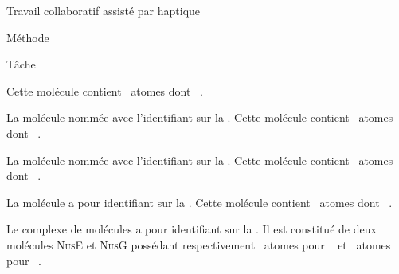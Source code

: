 \documentclass[myfrancais]{mythesis}
\begin{document}
\begin{mychapter}{Travail collaboratif assisté par haptique}
\begin{mysection}{Méthode}
\begin{mysubsection}{Tâche}
\begin{description}
						Cette molécule contient ~atomes dont ~.
					\item[\myPrion]
						La molécule nommée \myPrion {} avec l'identifiant \myPDB {} sur la \myPDBbase\footnotemark[\value{footnote}].
						Cette molécule contient ~atomes dont ~.
					\item[\myUbiquitin]
						La molécule nommée \myUbiquitin {} avec l'identifiant \myPDB {} sur la \myPDBbase\footnotemark[\value{footnote}].
						Cette molécule contient ~atomes dont ~.
					\item[\myTRPZIPPER]
						La molécule \myTRPZIPPER {} a pour identifiant \myPDB {} sur la \myPDBbase\footnotemark[\value{footnote}].
						Cette molécule contient ~atomes dont ~.
					\item[\myNusENusG]
						Le complexe de molécules \myNusENusG {} a pour identifiant \myPDB {} sur la \myPDBbase\footnotemark[\value{footnote}].
						Il est constitué de deux molécules \textsc{NusE} et \textsc{NusG} possédant respectivement ~atomes pour ~ et ~atomes pour ~.
				\end{description}


\end{mysubsection}
\end{mysection}
\end{mychapter}
\end{document}
